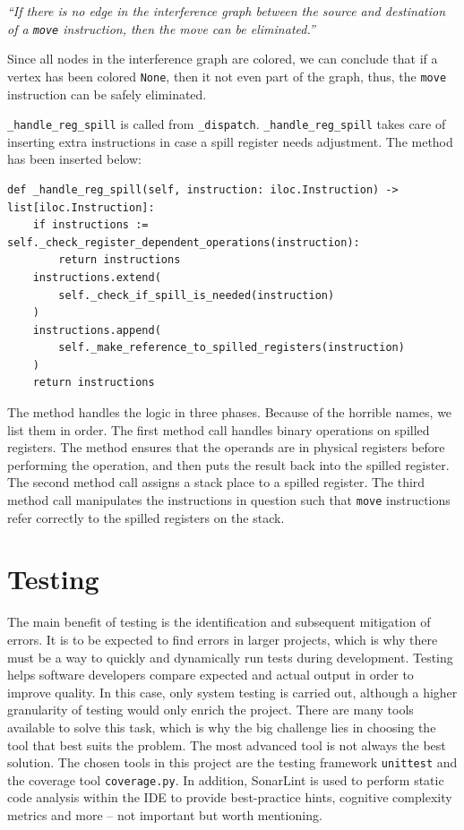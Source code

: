 \begin{displayquote}
    \textit{``If there is no edge in the interference graph between the source and destination of a \texttt{move} instruction, then the move can be eliminated.''}
\end{displayquote}
\hspace*{}

Since all nodes in the interference graph are colored, we can conclude that if a vertex has been colored \texttt{None}, then it not even part of the graph, thus, the \texttt{move} instruction can be safely eliminated.

\texttt{\_handle\_reg\_spill} is called from \texttt{\_dispatch}. \texttt{\_handle\_reg\_spill} takes care of inserting extra instructions in case a spill register needs adjustment. The method has been inserted below:

\begin{verbatim}
def _handle_reg_spill(self, instruction: iloc.Instruction) -> list[iloc.Instruction]:
    if instructions := self._check_register_dependent_operations(instruction):
        return instructions
    instructions.extend(
        self._check_if_spill_is_needed(instruction)
    )
    instructions.append(
        self._make_reference_to_spilled_registers(instruction)
    )
    return instructions
\end{verbatim}

The method handles the logic in three phases. Because of the horrible names, we list them in order. The first method call handles binary operations on spilled registers. The method ensures that the operands are in physical registers before performing the operation, and then puts the result back into the spilled register. The second method call assigns a stack place to a spilled register. The third method call manipulates the instructions in question such that \texttt{move} instructions refer correctly to the spilled registers on the stack.


\chapter{Testing}
The main benefit of testing is the identification and subsequent mitigation of errors. It is to be expected to find errors in larger projects, which is why there must be a way to quickly and dynamically run tests during development. Testing helps software developers compare expected and actual output in order to improve quality. In this case, only system testing is carried out, although a higher granularity of testing would only enrich the project. There are many tools available to solve this task, which is why the big challenge lies in choosing the tool that best suits the problem. The most advanced tool is not always the best solution. The chosen tools in this project are the testing framework \texttt{unittest} and the coverage tool \texttt{coverage.py}. In addition, SonarLint is used to perform static code analysis within the IDE to provide best-practice hints, cognitive complexity metrics and more -- not important but worth mentioning.


